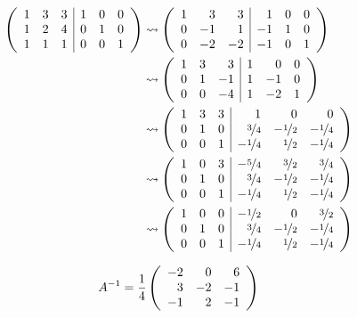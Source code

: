 \documentclass[main.tex]{subfiles}
\begin{document}
\begin{align*}
    \eqmatrix{rrr|rrr}{
        1 & 3 & 3 & 1 & 0 & 0 \\
        1 & 2 & 4 & 0 & 1 & 0 \\
        1 & 1 & 1 & 0 & 0 & 1 \\
    } &\leadsto 
    \eqmatrix{rrr|rrr}{
        1 &  3 &  3 &  1 & 0 & 0 \\
        0 & -1 &  1 & -1 & 1 & 0 \\
        0 & -2 & -2 & -1 & 0 & 1 \\
    } \\
    &\leadsto 
    \eqmatrix{rrr|rrr}{
        1 &  3 &  3 &  1 &  0 & 0 \\
        0 &  1 & -1 &  1 & -1 & 0 \\
        0 &  0 & -4 &  1 & -2 & 1 \\
    } \\
    &\leadsto 
    \eqmatrix{rrr|rrr}{
        1 &  3 &  3 &                 1 &                0 & 0 \\
        0 &  1 &  0 &   \nicefrac{3}{4} & -\nicefrac{1}{2} & -\nicefrac{1}{4} \\
        0 &  0 &  1 &  -\nicefrac{1}{4} &  \nicefrac{1}{2} & -\nicefrac{1}{4} \\
    } \\
    &\leadsto 
    \eqmatrix{rrr|rrr}{
        1 &  0 &  3 &  -\nicefrac{5}{4} &  \nicefrac{3}{2} &  \nicefrac{3}{4} \\
        0 &  1 &  0 &   \nicefrac{3}{4} & -\nicefrac{1}{2} & -\nicefrac{1}{4} \\
        0 &  0 &  1 &  -\nicefrac{1}{4} &  \nicefrac{1}{2} & -\nicefrac{1}{4} \\
    } \\
    &\leadsto 
    \eqmatrix{rrr|rrr}{
        1 &  0 &  0 &  -\nicefrac{1}{2} &                0 &  \nicefrac{3}{2} \\
        0 &  1 &  0 &   \nicefrac{3}{4} & -\nicefrac{1}{2} & -\nicefrac{1}{4} \\
        0 &  0 &  1 &  -\nicefrac{1}{4} &  \nicefrac{1}{2} & -\nicefrac{1}{4} \\
    }
\end{align*}

$$
    A^{-1} = \frac{1}{4} \eqmatrix{rrr}{
        -2 &  0 &  6 \\
         3 & -2 & -1 \\
        -1 &  2 & -1 \\
    }
$$
\end{document}
